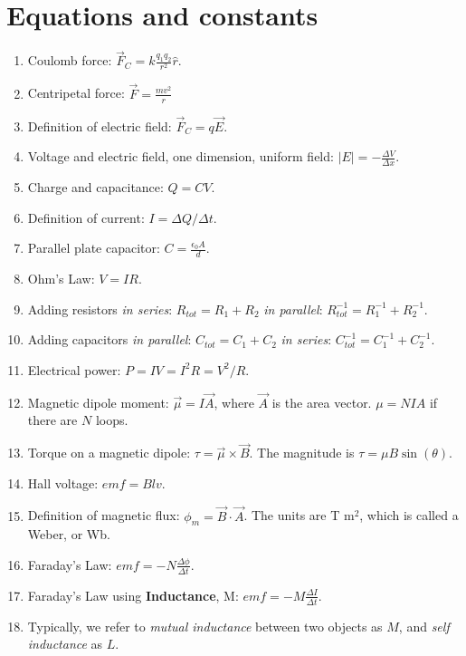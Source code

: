 \documentclass[10pt]{article}
\begin{document}
\maketitle

\section{Equations and constants}

\begin{enumerate}
\item Coulomb force: $\vec{F}_C = k \frac{q_1 q_2}{r^2}\hat{r}$.
\item Centripetal force: $\vec{F} = \frac{mv^2}{r}$
\item Definition of electric field: $\vec{F}_C = q\vec{E}$.
\item Voltage and electric field, one dimension, uniform field: $|E| = - \frac{\Delta V}{\Delta x}$.
\item Charge and capacitance: $Q = CV$.
\item Definition of current: $I = \Delta Q / \Delta t$.
\item Parallel plate capacitor: $C = \frac{\epsilon_0 A}{d}$.
\item Ohm's Law: $V = IR$.
\item Adding resistors \textit{in series}: $R_{tot} = R_1 + R_2$ \textit{in parallel}: $R_{tot}^{-1} = R_1^{-1} + R_2^{-1}$.
\item Adding capacitors \textit{in parallel}: $C_{tot} = C_1 + C_2$ \textit{in series}: $C_{tot}^{-1} = C_1^{-1} + C_2^{-1}$.
\item Electrical power: $P = IV = I^2 R = V^2/R$.
\item Magnetic dipole moment: $\vec{\mu} = I \vec{A}$, where $\vec{A}$ is the area vector. $\mu = N I A$ if there are $N$ loops.
\item Torque on a magnetic dipole: $\tau = \vec{\mu} \times \vec{B}$.  The magnitude is $\tau = \mu B \sin(\theta)$.
\item Hall voltage: $emf = B l v$.
\item Definition of magnetic flux: $\phi_m = \vec{B} \cdot \vec{A}$.  The units are T m$^2$, which is called a Weber, or Wb.
\item Faraday's Law: $emf = -N \frac{\Delta \phi}{\Delta t}$.
\item Faraday's Law using \textbf{Inductance}, M: $emf = -M \frac{\Delta I}{\Delta t}$.
\item Typically, we refer to \textit{mutual inductance} between two objects as $M$, and \textit{self inductance} as $L$.

\end{enumerate}
\end{document}
